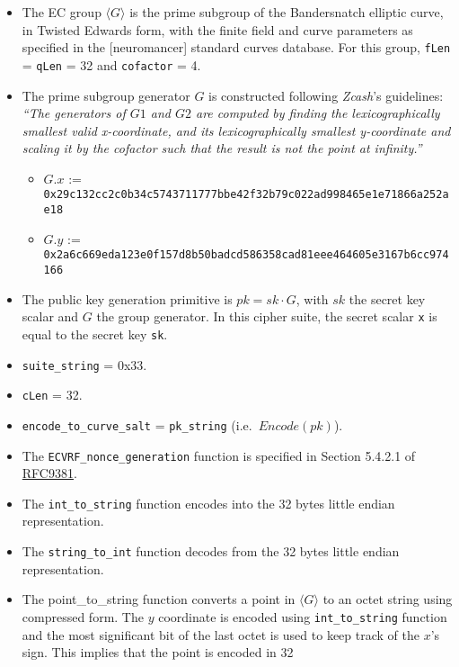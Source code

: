 \documentclass[
]{article}
\providecommand{\tightlist}{%
  \setlength{\itemsep}{0pt}\setlength{\parskip}{0pt}}
\begin{document}
\begin{itemize}
\item
  The EC group \(\langle G \rangle\) is the prime subgroup of the
  Bandersnatch elliptic curve, in Twisted Edwards form, with the finite
  field and curve parameters as specified in the {[}neuromancer{]}
  standard curves database. For this group, \texttt{fLen} =
  \texttt{qLen} = 32 and \texttt{cofactor} = 4.
\item
  The prime subgroup generator \(G\) is constructed following
  \emph{Zcash}'s guidelines: \emph{``The generators of \(G1\) and \(G2\)
  are computed by finding the lexicographically smallest valid
  x-coordinate, and its lexicographically smallest y-coordinate and
  scaling it by the cofactor such that the result is not the point at
  infinity.''}

  \begin{itemize}
  \tightlist
  \item
    \(G.x\) :=
    \texttt{0x29c132cc2c0b34c5743711777bbe42f32b79c022ad998465e1e71866a252ae18}
  \item
    \(G.y\) :=
    \texttt{0x2a6c669eda123e0f157d8b50badcd586358cad81eee464605e3167b6cc974166}
  \end{itemize}
\item
  The public key generation primitive is \(pk = sk \cdot G\), with
  \(sk\) the secret key scalar and \(G\) the group generator. In this
  cipher suite, the secret scalar \texttt{x} is equal to the secret key
  \texttt{sk}.
\item
  \texttt{suite\_string} = 0x33.
\item
  \texttt{cLen} = 32.
\item
  \texttt{encode\_to\_curve\_salt} = \texttt{pk\_string}
  (i.e.~\(Encode(pk)\)).
\item
  The \texttt{ECVRF\_nonce\_generation} function is specified in Section
  5.4.2.1 of \href{https://datatracker.ietf.org/doc/rfc9381}{RFC9381}.
\item
  The \texttt{int\_to\_string} function encodes into the 32 bytes little
  endian representation.
\item
  The \texttt{string\_to\_int} function decodes from the 32 bytes little
  endian representation.
\item
  The point\_to\_string function converts a point in
  \(\langle G \rangle\) to an octet string using compressed form. The
  \(y\) coordinate is encoded using \texttt{int\_to\_string} function
  and the most significant bit of the last octet is used to keep track
  of the \(x\)'s sign. This implies that the point is encoded in 32

\end{itemize}
\end{document}
